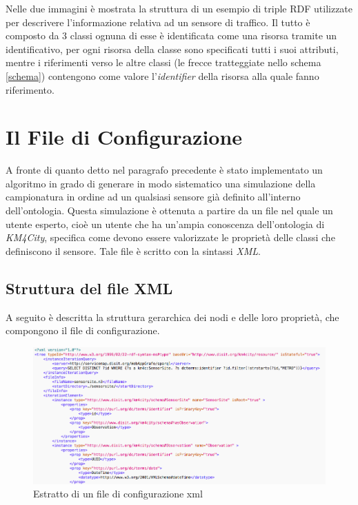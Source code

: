 \documentclass[12pt,a4paper,italian]{article}
\begin{document}
\newline
Nelle due immagini è mostrata la struttura di un esempio di triple RDF utilizzate per descrivere l'informazione relativa ad un sensore di traffico. Il tutto è composto da 3 classi ognuna di esse è identificata come una risorsa tramite un identificativo, per ogni risorsa della classe sono specificati tutti i suoi attributi, mentre i riferimenti verso le altre classi (le frecce tratteggiate nello schema \ref{schema}) contengono come valore l'\emph{identifier} della risorsa alla quale fanno riferimento. 
\newpage

\section{Il File di Configurazione}
A fronte di quanto detto nel paragrafo precedente è stato implementato un algoritmo in grado di generare in modo sistematico una simulazione della campionatura in ordine ad un qualsiasi  sensore già definito all'interno dell'ontologia.
Questa simulazione è ottenuta a partire da un file nel quale un utente esperto, cioè un utente che ha un'ampia conoscenza dell'ontologia di \emph{KM4City}, specifica come devono essere valorizzate le proprietà 
delle classi che definiscono il sensore. Tale file è scritto con la sintassi \emph{XML}.

\subsection{Struttura del file XML}
A seguito è descritta la struttura gerarchica dei nodi e delle loro proprietà, che compongono il file di configurazione.\\

\begin{figure}[h!]
	\centering
	\includegraphics[width=14cm]{img/configxml.png}
	\caption{Estratto di un file di configurazione xml}\label{configxml}
\end{figure}
\end{document}
